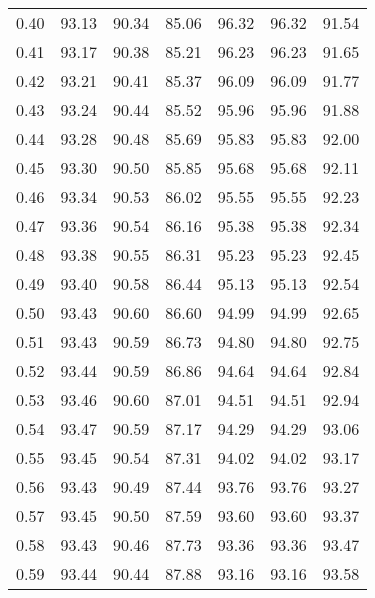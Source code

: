 \begin{tabular}{|c|c|c|c|c|c|c|}
      0.40 &     93.13 &     90.34 &      85.06 &   96.32 &      96.32 &         91.54 \\
      0.41 &     93.17 &     90.38 &      85.21 &   96.23 &      96.23 &         91.65 \\
      0.42 &     93.21 &     90.41 &      85.37 &   96.09 &      96.09 &         91.77 \\
      0.43 &     93.24 &     90.44 &      85.52 &   95.96 &      95.96 &         91.88 \\
      0.44 &     93.28 &     90.48 &      85.69 &   95.83 &      95.83 &         92.00 \\
      0.45 &     93.30 &     90.50 &      85.85 &   95.68 &      95.68 &         92.11 \\
      0.46 &     93.34 &     90.53 &      86.02 &   95.55 &      95.55 &         92.23 \\
      0.47 &     93.36 &     90.54 &      86.16 &   95.38 &      95.38 &         92.34 \\
      0.48 &     93.38 &     90.55 &      86.31 &   95.23 &      95.23 &         92.45 \\
      0.49 &     93.40 &     90.58 &      86.44 &   95.13 &      95.13 &         92.54 \\
      0.50 &     93.43 &     90.60 &      86.60 &   94.99 &      94.99 &         92.65 \\
      0.51 &     93.43 &     90.59 &      86.73 &   94.80 &      94.80 &         92.75 \\
      0.52 &     93.44 &     90.59 &      86.86 &   94.64 &      94.64 &         92.84 \\
      0.53 &     93.46 &     90.60 &      87.01 &   94.51 &      94.51 &         92.94 \\
      0.54 &     93.47 &     90.59 &      87.17 &   94.29 &      94.29 &         93.06 \\
      0.55 &     93.45 &     90.54 &      87.31 &   94.02 &      94.02 &         93.17 \\
      0.56 &     93.43 &     90.49 &      87.44 &   93.76 &      93.76 &         93.27 \\
      0.57 &     93.45 &     90.50 &      87.59 &   93.60 &      93.60 &         93.37 \\
      0.58 &     93.43 &     90.46 &      87.73 &   93.36 &      93.36 &         93.47 \\
      0.59 &     93.44 &     90.44 &      87.88 &   93.16 &      93.16 &         93.58 \\

\end{tabular}
